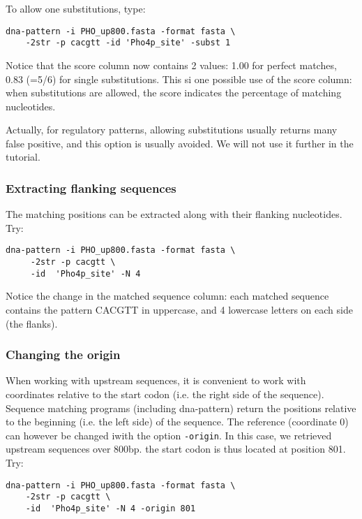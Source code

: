 To allow one substitutions, type:
\begin{verbatim}
dna-pattern -i PHO_up800.fasta -format fasta \
    -2str -p cacgtt -id 'Pho4p_site' -subst 1
\end{verbatim}

Notice that the score column now contains 2 values: 1.00 for perfect
matches, 0.83 (=5/6) for single substitutions. This si one possible
use of the score column: when substitutions are allowed, the score
indicates the percentage of matching nucleotides.

Actually, for regulatory patterns, allowing substitutions usually
returns many false positive, and this option is usually avoided. We
will not use it further in the tutorial.

\subsubsection{Extracting flanking sequences}

The matching positions can be extracted along with their flanking nucleotides. Try:

\begin{verbatim}
dna-pattern -i PHO_up800.fasta -format fasta \
     -2str -p cacgtt \
     -id  'Pho4p_site' -N 4
\end{verbatim}

Notice the change in the matched sequence column: each matched
sequence contains the pattern CACGTT in uppercase, and 4 lowercase
letters on each side (the flanks).

\subsubsection{Changing the origin}

When working with upstream sequences, it is convenient to work with
coordinates relative to the start codon (i.e. the right side of the
sequence). Sequence matching programs (including dna-pattern) return
the positions relative to the beginning (i.e. the left side) of the
sequence. The reference (coordinate 0) can however be changed iwith
the option \texttt{-origin}. In this case, we retrieved upstream
sequences over 800bp. the start codon is thus located at position
801. Try:

\begin{verbatim}
dna-pattern -i PHO_up800.fasta -format fasta \
    -2str -p cacgtt \
    -id  'Pho4p_site' -N 4 -origin 801
\end{verbatim}

